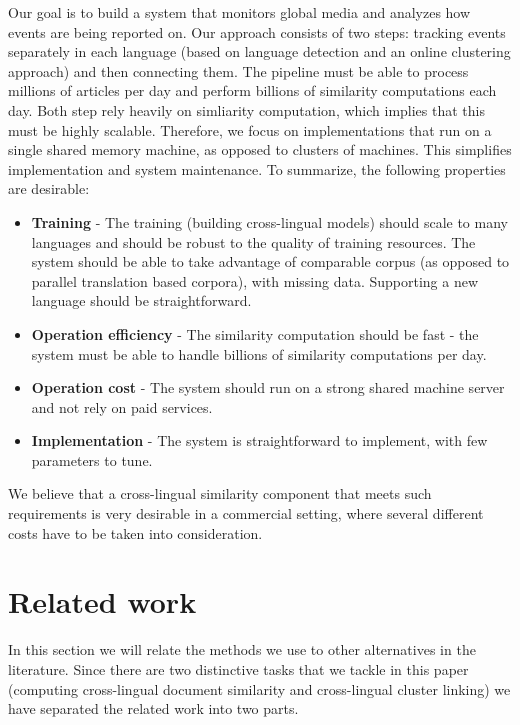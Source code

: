 \documentclass[twoside,11pt]{article}
\begin{document}
Our goal is to build a system that monitors global media and analyzes how events are being reported on. Our approach consists of two steps: tracking events separately in each language (based on language detection and an online clustering approach) and then connecting them. The pipeline must be able to process millions of articles per day and perform billions of similarity computations each day. Both step rely heavily on simliarity computation, which implies that this must be highly scalable.
%
Therefore, we focus on implementations that run on a single shared memory machine, as opposed to clusters of machines. This  simplifies implementation and system maintenance.
To summarize, the following properties are desirable:
\begin{itemize}
\item \textbf{Training} - The training (building cross-lingual models) should scale to many languages and should be robust to the quality of training resources. The system should be able to take advantage of comparable corpus (as opposed to parallel translation based corpora), with missing data. Supporting a new language should be straightforward.
\item \textbf{Operation efficiency} - The similarity computation should be fast - the system must be able to handle billions of similarity computations per day.
\item \textbf{Operation cost} - The system should run on a strong shared machine server and not rely on paid services.
\item \textbf{Implementation} - The system is straightforward to implement, with few parameters to tune.
\end{itemize}
We believe that a cross-lingual similarity component that meets such requirements is very desirable in a commercial setting, where several different costs have to be taken into consideration.


\section{Related work}

In this section we will relate the methods we use to other alternatives in the literature. Since there are two distinctive tasks that we tackle in this paper (computing cross-lingual document similarity and cross-lingual cluster linking) we have separated the related work into two parts.
\end{document}
